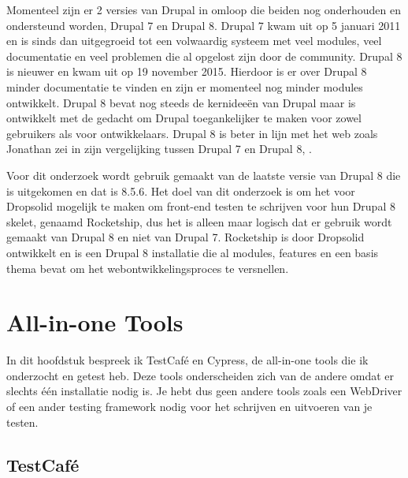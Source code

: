 Momenteel zijn er 2 versies van Drupal in omloop die beiden nog onderhouden en ondersteund worden, Drupal 7 en Drupal 8. Drupal 7 kwam uit op 5 januari 2011 en is sinds dan uitgegroeid tot een volwaardig systeem met veel modules, veel documentatie en veel problemen die al opgelost zijn door de community. Drupal 8 is nieuwer en kwam uit op 19 november 2015. Hierdoor is er over Drupal 8 minder documentatie te vinden en zijn er momenteel nog minder modules ontwikkelt. Drupal 8 bevat nog steeds de kernideeën van Drupal maar is ontwikkelt met de gedacht om Drupal toegankelijker te maken voor zowel gebruikers als voor ontwikkelaars. Drupal 8 is beter in lijn met het web zoals Jonathan zei in zijn vergelijking tussen Drupal 7 en Drupal 8, \cite{Ramael2015}.

Voor dit onderzoek wordt gebruik gemaakt van de laatste versie van Drupal 8 die is uitgekomen en dat is 8.5.6. Het doel van dit onderzoek is om het voor Dropsolid mogelijk te maken om front-end testen te schrijven voor hun Drupal 8 skelet, genaamd Rocketship, dus het is alleen maar logisch dat er gebruik wordt gemaakt van Drupal 8 en niet van Drupal 7. Rocketship is door Dropsolid ontwikkelt en is een Drupal 8 installatie die al modules, features en een basis thema bevat om het webontwikkelingsproces te versnellen.


\section{All-in-one Tools}
In dit hoofdstuk bespreek ik TestCafé en Cypress, de all-in-one tools die ik onderzocht en getest heb. Deze tools onderscheiden zich van de andere omdat er slechts één installatie nodig is. Je hebt dus geen andere tools zoals een WebDriver of een ander testing framework nodig voor het schrijven en uitvoeren van je testen.

\subsection{TestCafé}
